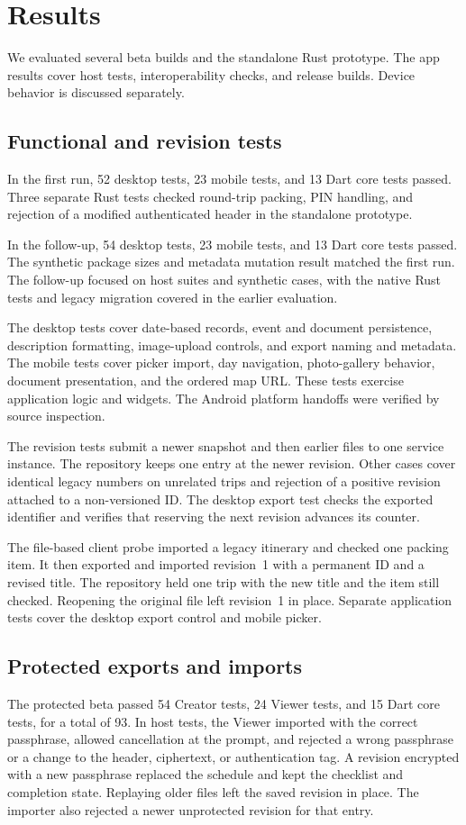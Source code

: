 \section{Results}
\label{sec:evaluation}
We evaluated several beta builds and the standalone Rust prototype. The app results cover host tests, interoperability checks, and release builds. Device behavior is discussed separately.

\subsection{Functional and revision tests}
In the first run, 52 desktop tests, 23 mobile tests, and 13 Dart core tests passed. Three separate Rust tests checked round-trip packing, PIN handling, and rejection of a modified authenticated header in the standalone prototype.

In the follow-up, 54 desktop tests, 23 mobile tests, and 13 Dart core tests passed. The synthetic package sizes and metadata mutation result matched the first run. The follow-up focused on host suites and synthetic cases, with the native Rust tests and legacy migration covered in the earlier evaluation.

The desktop tests cover date-based records, event and document persistence, description formatting, image-upload controls, and export naming and metadata. The mobile tests cover picker import, day navigation, photo-gallery behavior, document presentation, and the ordered map URL. These tests exercise application logic and widgets. The Android platform handoffs were verified by source inspection.

The revision tests submit a newer snapshot and then earlier files to one service instance. The repository keeps one entry at the newer revision. Other cases cover identical legacy numbers on unrelated trips and rejection of a positive revision attached to a non-versioned ID. The desktop export test checks the exported identifier and verifies that reserving the next revision advances its counter.

The file-based client probe imported a legacy itinerary and checked one packing item. It then exported and imported revision~1 with a permanent ID and a revised title. The repository held one trip with the new title and the item still checked. Reopening the original file left revision~1 in place. Separate application tests cover the desktop export control and mobile picker.

\subsection{Protected exports and imports}
The protected beta passed 54 Creator tests, 24 Viewer tests, and 15 Dart core tests, for a total of 93. In host tests, the Viewer imported with the correct passphrase, allowed cancellation at the prompt, and rejected a wrong passphrase or a change to the header, ciphertext, or authentication tag. A revision encrypted with a new passphrase replaced the schedule and kept the checklist and completion state. Replaying older files left the saved revision in place. The importer also rejected a newer unprotected revision for that entry.

